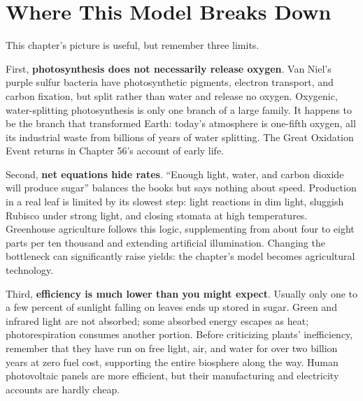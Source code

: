 \section{Where This Model Breaks Down}

This chapter's picture is useful, but remember three limits.

First, \textbf{photosynthesis does not necessarily release oxygen}. Van Niel's purple sulfur bacteria have photosynthetic pigments, electron transport, and carbon fixation, but split  rather than water and release no oxygen. Oxygenic, water-splitting photosynthesis is only one branch of a large family. It happens to be the branch that transformed Earth: today's atmosphere is one-fifth oxygen, all its industrial waste from billions of years of water splitting. The Great Oxidation Event returns in Chapter 56's account of early life.

Second, \textbf{net equations hide rates}. ``Enough light, water, and carbon dioxide will produce sugar'' balances the books but says nothing about speed. Production in a real leaf is limited by its slowest step: light reactions in dim light, sluggish Rubisco under strong light, and closing stomata at high temperatures. Greenhouse agriculture follows this logic, supplementing  from about four to eight parts per ten thousand and extending artificial illumination. Changing the bottleneck can significantly raise yields: the chapter's model becomes agricultural technology.

Third, \textbf{efficiency is much lower than you might expect}. Usually only one to a few percent of sunlight falling on leaves ends up stored in sugar. Green and infrared light are not absorbed; some absorbed energy escapes as heat; photorespiration consumes another portion. Before criticizing plants' inefficiency, remember that they have run on free light, air, and water for over two billion years at zero fuel cost, supporting the entire biosphere along the way. Human photovoltaic panels are more efficient, but their manufacturing and electricity accounts are hardly cheap.

